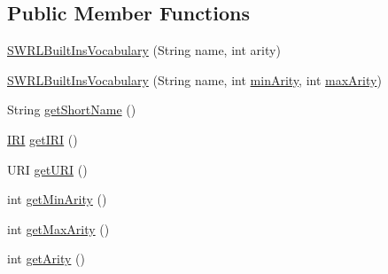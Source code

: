 \subsection*{Public Member Functions}
\begin{DoxyCompactItemize}
\item 
\hyperlink{enumorg_1_1semanticweb_1_1owlapi_1_1vocab_1_1_s_w_r_l_built_ins_vocabulary_ac08777c015bbd78670b45a7af5077f04}{S\-W\-R\-L\-Built\-Ins\-Vocabulary} (String name, int arity)
\item 
\hyperlink{enumorg_1_1semanticweb_1_1owlapi_1_1vocab_1_1_s_w_r_l_built_ins_vocabulary_a02426666f629169b329cf237c9c32298}{S\-W\-R\-L\-Built\-Ins\-Vocabulary} (String name, int \hyperlink{enumorg_1_1semanticweb_1_1owlapi_1_1vocab_1_1_s_w_r_l_built_ins_vocabulary_a8a82960bde04f8eb5e5fc1892d30f8fb}{min\-Arity}, int \hyperlink{enumorg_1_1semanticweb_1_1owlapi_1_1vocab_1_1_s_w_r_l_built_ins_vocabulary_afcd23aa29c595c24beca57f1db5d0214}{max\-Arity})
\item 
String \hyperlink{enumorg_1_1semanticweb_1_1owlapi_1_1vocab_1_1_s_w_r_l_built_ins_vocabulary_a9912f974de52c6405be7ef217b713607}{get\-Short\-Name} ()
\item 
\hyperlink{classorg_1_1semanticweb_1_1owlapi_1_1model_1_1_i_r_i}{I\-R\-I} \hyperlink{enumorg_1_1semanticweb_1_1owlapi_1_1vocab_1_1_s_w_r_l_built_ins_vocabulary_a36cb2909f09f754eba9e1750b208d88c}{get\-I\-R\-I} ()
\item 
U\-R\-I \hyperlink{enumorg_1_1semanticweb_1_1owlapi_1_1vocab_1_1_s_w_r_l_built_ins_vocabulary_aba22d6f06ba5759b0b7376b47ca67faa}{get\-U\-R\-I} ()
\item 
int \hyperlink{enumorg_1_1semanticweb_1_1owlapi_1_1vocab_1_1_s_w_r_l_built_ins_vocabulary_a392d531a1e1a226d4501d91327274d55}{get\-Min\-Arity} ()
\item 
int \hyperlink{enumorg_1_1semanticweb_1_1owlapi_1_1vocab_1_1_s_w_r_l_built_ins_vocabulary_a5c18ee7453f403dc86b623d03d859812}{get\-Max\-Arity} ()
\item 
int \hyperlink{enumorg_1_1semanticweb_1_1owlapi_1_1vocab_1_1_s_w_r_l_built_ins_vocabulary_a76018203019bac62825220d2effe1bb7}{get\-Arity} ()
\end{DoxyCompactItemize}
